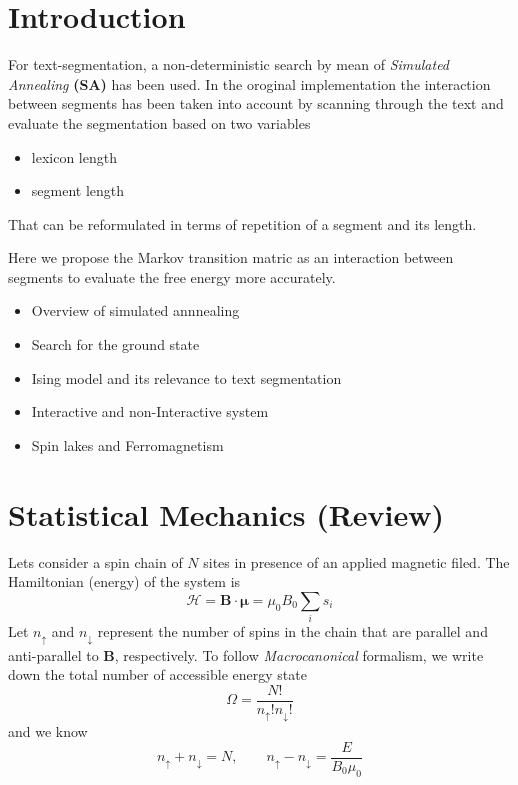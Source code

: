 \documentclass[11pt]{article}
\newcommand{\hl}{\mathcal{H}}
\newcommand{\upp}{\uparrow}
\newcommand{\dnn}{\downarrow}
\newcommand{\bs}[1]{\boldsymbol{#1}}
\begin{document}
\section{Introduction}
For text-segmentation, a non-deterministic search by mean of {\em
  Simulated Annealing} {\bf(SA)} has been used. In the oroginal
implementation the interaction between segments has been taken into
account by scanning through the text and evaluate the segmentation
based on two variables
\begin{itemize}
\item lexicon length
\item segment length
\end{itemize}
That can be reformulated in terms of repetition of a segment and its
length.

Here we propose the Markov transition matric as an
interaction between segments to evaluate the free energy more
accurately.

\begin{itemize}
\item Overview of simulated annnealing
\item Search for the ground state
\item Ising model and its relevance to text segmentation
\item Interactive and non-Interactive system
\item Spin lakes and Ferromagnetism 
\end{itemize}

\section{Statistical Mechanics (Review)}

Lets consider a spin chain of $N$ sites in presence of an applied
magnetic filed. The Hamiltonian (energy) of the system is
\begin{equation}
  \hl = \bs{B}\cdot \bs{\mu} = \mu_0 B_0 \sum_i s_i
\end{equation}
Let $n_\upp$ and $n_\dnn$ represent the number of spins in
the chain that are parallel and anti-parallel to $\bs{B}$,
respectively. To follow {\em Macrocanonical} formalism, we write down
the total number of accessible energy state
\begin{equation}
  \Omega = \frac{N!}{n_{\upp}! n_{\dnn}!}
\end{equation}
and we know
\begin{equation}
  n_\upp + n_\dnn = N, \qquad n_\upp - n_\dnn = \frac{E}{B_0 \mu_0}
\end{equation}
\end{document}
